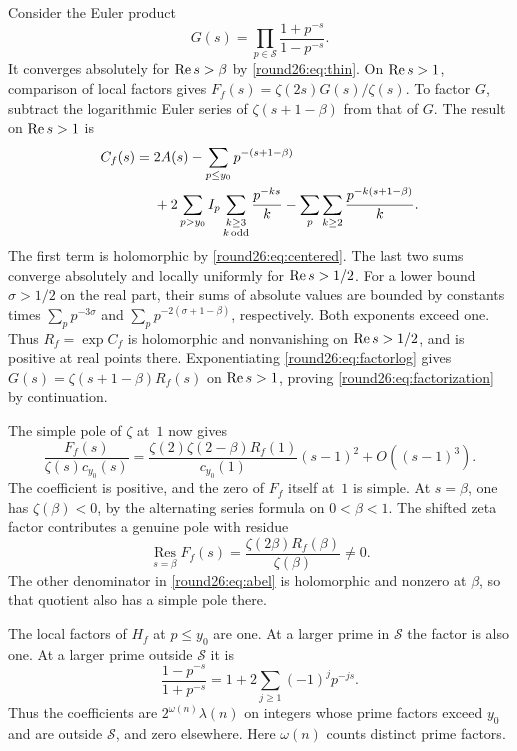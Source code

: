 Consider the Euler product
\[
 G(s)=\prod_{p\in\mathcal S}\frac{1+p^{-s}}{1-p^{-s}}.
\]
It converges absolutely for $\operatorname{Re} s>\beta$ by \eqref{round26:eq:thin}.
On $\operatorname{Re} s>1$, comparison of local factors gives
$F_f(s)=\zeta(2s)G(s)/\zeta(s)$. To factor $G$, subtract the
logarithmic Euler series of $\zeta(s+1-\beta)$ from that of $G$.
The result on $\operatorname{Re} s>1$ is
\begin{align}
 C_f(s)={}&2A(s)-\sum_{p\le y_0}p^{-(s+1-\beta)}\notag\\
  &+2\sum_{p>y_0}I_p
       \sum_{\substack{k\ge3\\ k\,\mathrm{odd}}}\frac{p^{-ks}}k
       -\sum_p\sum_{k\ge2}\frac{p^{-k(s+1-\beta)}}k.
       \label{round26:eq:factorlog}
\end{align}
The first term is holomorphic by \eqref{round26:eq:centered}. The last two
sums converge absolutely and locally uniformly for $\operatorname{Re} s>1/2$.
For a lower bound $\sigma>1/2$ on the real part, their sums of
absolute values are bounded by constants times $\sum_p p^{-3\sigma}$
and $\sum_p p^{-2(\sigma+1-\beta)}$, respectively. Both exponents
exceed one. Thus $R_f=\exp C_f$ is holomorphic and nonvanishing on
$\operatorname{Re} s>1/2$, and is positive at real points there. Exponentiating
\eqref{round26:eq:factorlog} gives $G(s)=\zeta(s+1-\beta)R_f(s)$ on
$\operatorname{Re} s>1$, proving \eqref{round26:eq:factorization} by continuation.

The simple pole of $\zeta$ at~$1$ now gives
\begin{equation}\label{round26:eq:abel}
 \frac{F_f(s)}{\zeta(s)c_{y_0}(s)}
 =\frac{\zeta(2)\zeta(2-\beta)R_f(1)}{c_{y_0}(1)}(s-1)^2
       +O((s-1)^3).
\end{equation}
The coefficient is positive, and the zero of $F_f$ itself at~$1$
is simple. At $s=\beta$, one has $\zeta(\beta)<0$, by the alternating
series formula on $0<\beta<1$. The shifted zeta factor contributes
a genuine pole with residue
\begin{equation}\label{round26:eq:residue}
 \operatorname*{Res}_{s=\beta}F_f(s)
    =\frac{\zeta(2\beta)R_f(\beta)}{\zeta(\beta)}\ne0.
\end{equation}
The other denominator in \eqref{round26:eq:abel} is holomorphic and nonzero
at $\beta$, so that quotient also has a simple pole there.

The local factors of $H_f$ at $p\le y_0$ are one. At a larger prime in
$\mathcal S$ the factor is also one. At a larger prime outside
$\mathcal S$ it is
\[
 \frac{1-p^{-s}}{1+p^{-s}}=1+2\sum_{j\ge1}(-1)^jp^{-js}.
\]
Thus the coefficients are $2^{\omega(n)}\lambda(n)$ on integers
whose prime factors exceed $y_0$ and are outside $\mathcal S$,
and zero elsewhere. Here $\omega(n)$ counts distinct prime factors.

